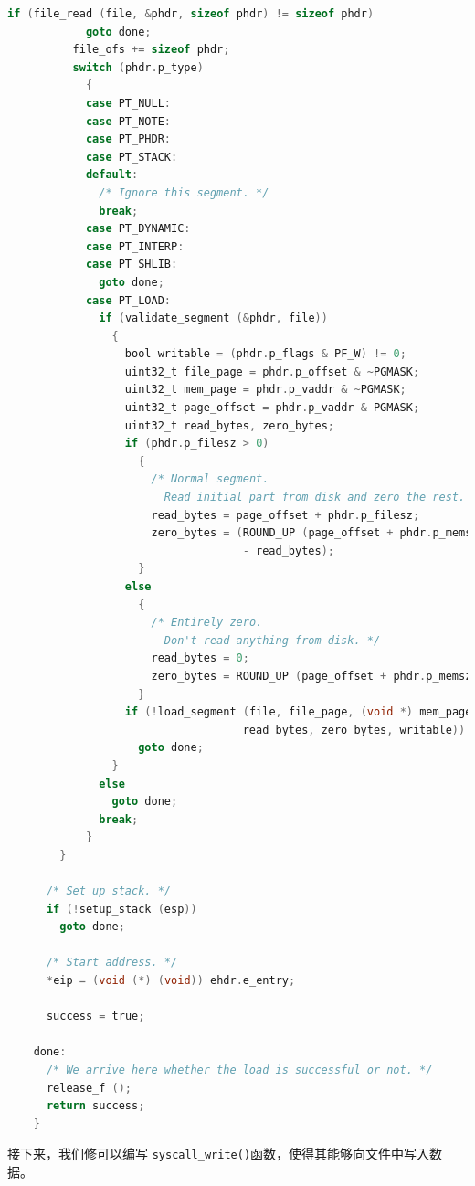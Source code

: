 \documentclass{article}
\begin{document}
\begin{lstlisting}[language=C, title=\texttt{src/userprog/process.c - load()}]
          if (file_read (file, &phdr, sizeof phdr) != sizeof phdr)
            goto done;
          file_ofs += sizeof phdr;
          switch (phdr.p_type) 
            {
            case PT_NULL:
            case PT_NOTE:
            case PT_PHDR:
            case PT_STACK:
            default:
              /* Ignore this segment. */
              break;
            case PT_DYNAMIC:
            case PT_INTERP:
            case PT_SHLIB:
              goto done;
            case PT_LOAD:
              if (validate_segment (&phdr, file)) 
                {
                  bool writable = (phdr.p_flags & PF_W) != 0;
                  uint32_t file_page = phdr.p_offset & ~PGMASK;
                  uint32_t mem_page = phdr.p_vaddr & ~PGMASK;
                  uint32_t page_offset = phdr.p_vaddr & PGMASK;
                  uint32_t read_bytes, zero_bytes;
                  if (phdr.p_filesz > 0)
                    {
                      /* Normal segment.
                        Read initial part from disk and zero the rest. */
                      read_bytes = page_offset + phdr.p_filesz;
                      zero_bytes = (ROUND_UP (page_offset + phdr.p_memsz, PGSIZE)
                                    - read_bytes);
                    }
                  else 
                    {
                      /* Entirely zero.
                        Don't read anything from disk. */
                      read_bytes = 0;
                      zero_bytes = ROUND_UP (page_offset + phdr.p_memsz, PGSIZE);
                    }
                  if (!load_segment (file, file_page, (void *) mem_page,
                                    read_bytes, zero_bytes, writable))
                    goto done;
                }
              else
                goto done;
              break;
            }
        }
    
      /* Set up stack. */
      if (!setup_stack (esp))
        goto done;
    
      /* Start address. */
      *eip = (void (*) (void)) ehdr.e_entry;
    
      success = true;
    
    done:
      /* We arrive here whether the load is successful or not. */
      release_f ();
      return success;
    }
\end{lstlisting}

接下来，我们修可以编写 \texttt{syscall\_write()}函数，使得其能够向文件中写入数据。
\end{document}
